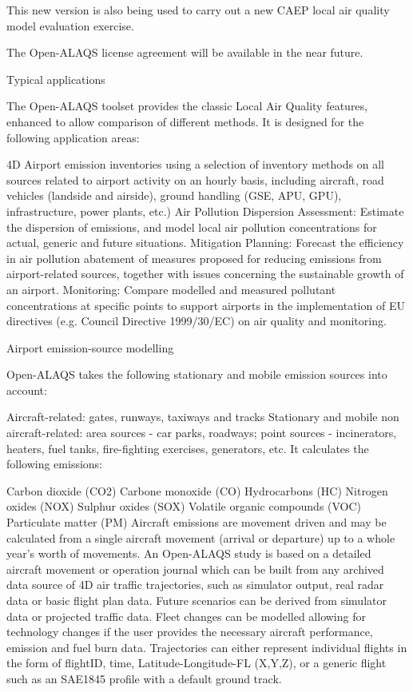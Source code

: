 \documentclass[a4paper]{article}
\begin{document}
    This new version is also being used to carry out a new CAEP local air quality model evaluation exercise.
    
    The Open-ALAQS license agreement will be available in the near future.
    
    
    Typical applications
    
    The Open-ALAQS toolset provides the classic Local Air Quality features, enhanced to allow comparison of different methods. It is designed for the following application areas:
    
    4D Airport emission inventories using a selection of inventory methods on all sources related to airport activity on an hourly basis, including aircraft, road vehicles (landside and airside), ground handling (GSE, APU, GPU), infrastructure, power plants, etc.)
    Air Pollution Dispersion Assessment: Estimate the dispersion of emissions, and model local air pollution concentrations for actual, generic and future situations.
    Mitigation Planning: Forecast the efficiency in air pollution abatement of measures proposed for reducing emissions from airport-related sources, together with issues concerning the sustainable growth of an airport.
    Monitoring: Compare modelled and measured pollutant concentrations at specific points to support airports in the implementation of EU directives (e.g. Council Directive 1999/30/EC) on air quality and monitoring.
    
    Airport emission-source modelling
    
    Open-ALAQS takes the following stationary and mobile emission sources into account:
    
    Aircraft-related: gates, runways, taxiways and tracks
    Stationary and mobile non aircraft-related: area sources - car parks, roadways; point sources - incinerators, heaters, fuel tanks, fire-fighting exercises, generators, etc.
    It calculates the following emissions:
    
    Carbon dioxide (CO2)
    Carbone monoxide (CO)
    Hydrocarbons (HC)
    Nitrogen oxides (NOX)
    Sulphur oxides (SOX)
    Volatile organic compounds (VOC)
    Particulate matter (PM)
    Aircraft emissions are movement driven and may be calculated from a single aircraft movement (arrival or departure) up to a whole year’s worth of movements. An Open-ALAQS study is based on a detailed aircraft movement or operation journal which can be built from any archived data source of 4D air traffic  trajectories, such as simulator output, real radar data or basic flight plan data. Future scenarios can be derived from simulator data or projected traffic data. Fleet changes can be modelled allowing for technology changes if the user provides the necessary aircraft performance, emission and fuel burn data. Trajectories can either represent individual flights in the form of flightID, time, Latitude-Longitude-FL (X,Y,Z), or a generic flight such as an SAE1845 profile with a default ground track.
    
\end{document}
